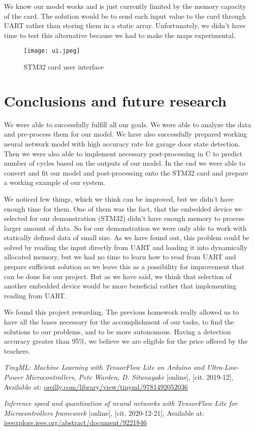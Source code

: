 \documentclass[12pt, letterpaper]{article}
\begin{document}
We know our model works and is just currently limited by the memory capacity of the card. The solution would be to send each input value to the card through UART rather than storing them in a static array. Unfortunately, we didn't have time to test this alternative because we had to make the maps experimental.

\begin{figure}[H]
    \centering
    \texttt{[image: ui.jpeg]}
    \caption{STM32 card user interface}
    \label{fig:stm32-ui}
\end{figure}

\newpage
\section{Conclusions and future research}
We were able to successfully fulfill all our goals. We were able to analyze the data and pre-process them for our model. We have also successfully prepared working neural network model with high accuracy rate for garage door state detection. Then we were also able to implement necessary post-processing in C to predict number of cycles based on the outputs of our model. In the end we were able to convert and fit our model and post-processing onto the STM32 card and prepare a working example of our system.

We noticed few things, which we think can be improved, but we didn't have enough time for them. One of them was the fact, that the embedded device we selected for our demonstration (STM32) didn't have enough memory to process larger amount of data. So for our demonstration we were only able to work with statically defined data of small size. As we have found out, this problem could be solved by reading the input directly from UART and loading it into dynamically allocated memory, but we had no time to learn how to read from UART and prepare sufficient solution so we leave this as a possibility for improvement that can be done for our project. But as we have said, we think that selection of another embedded device would be more beneficial rather that implementing reading from UART.

We found this project rewarding. The previous homework really allowed us to have all the bases necessary for the accomplishment of our tasks, to find the solutions to our problems, and to be more autonomous. Having a detection accuracy greater than 95\%, we believe we are eligible for the price offered by the teachers.

\newpage
\begin{thebibliography}{9}
     \emph{TinyML: Machine Learning with TensorFlow Lite on Arduino and Ultra-Low-Power Microcontrollers, Pete Warden, D. Situnayake} [online], [cit. 2019-12], Available at: \url{oreilly.com/library/view/tinyml/9781492052036}
    
     \emph{Inference speed and quantisation of neural networks with TensorFlow Lite for Microcontrollers framework} [online], [cit. 2020-12-21], Available at: \url{ieeexplore.ieee.org/abstract/document/9221846}
\end{thebibliography}
\end{document}
